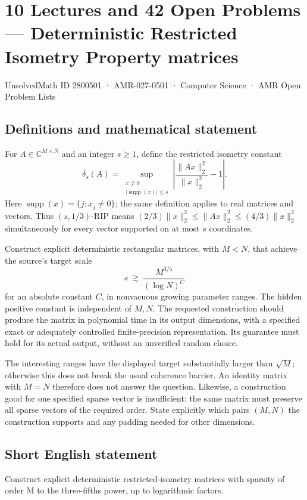 \documentclass[11pt,a4paper]{article}
\begin{document}
\section*{10 Lectures and 42 Open Problems — Deterministic Restricted Isometry Property matrices}\label{2800501}
{\small UnsolvedMath ID 2800501 · AMR-027-0501 · Computer Science · AMR Open Problem Lists}
\subsection{Definitions and mathematical statement}
For $A\in\mathbb C^{M\times N}$ and an integer $s\ge1$, define the
restricted isometry constant
\[
 \delta_s(A)=\sup_{\substack{x\ne0\\|\operatorname{supp}(x)|\le s}}
             \left|\frac{\|Ax\|_2^2}{\|x\|_2^2}-1\right|.
\]
Here $\operatorname{supp}(x)=\{j:x_j\ne0\}$; the same definition applies
to real matrices and vectors. Thus $(s,1/3)$-RIP means
$(2/3)\|x\|_2^2\le\|Ax\|_2^2\le(4/3)\|x\|_2^2$ simultaneously
for every vector supported on at most $s$ coordinates.

Construct explicit deterministic rectangular matrices, with $M<N$,
that achieve the source's target scale
\[
                  s\ \gtrsim\ \frac{M^{3/5}}{(\log N)^C}
\]
for an absolute constant $C$, in nonvacuous growing parameter ranges.
The hidden positive constant is independent of $M,N$. The requested
construction should produce the matrix in polynomial time in its
output dimensions, with a specified exact or adequately controlled
finite-precision representation. Its guarantee must hold for its
actual output, without an unverified random choice.

The interesting ranges have the displayed target substantially larger
than $\sqrt M$; otherwise this does not break the usual coherence
barrier. An identity matrix with $M=N$ therefore does not answer the
question. Likewise, a construction good for one specified sparse
vector is insufficient: the same matrix must preserve all sparse
vectors of the required order. State explicitly which pairs $(M,N)$
the construction supports and any padding needed for other dimensions.
\subsection{Short English statement}
Construct explicit deterministic restricted-isometry matrices with sparsity of order M to the three-fifths power, up to logarithmic factors.
\end{document}

